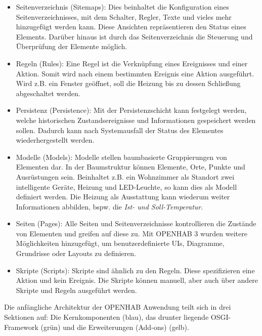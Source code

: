     \begin{itemize}
        \item Seitenverzeichnis (Sitemaps): Dies beinhaltet die Konfiguration eines Seitenverzeichnisses, mit dem Schalter, 
        Regler, Texte und vieles mehr hinzugefügt werden kann. Diese Ansichten repräsentieren den Status eines Elements. Darüber hinaus ist 
        durch das Seitenverzeichnis die Steuerung und Überprüfung der Elemente möglich.
        \item Regeln (Rules): Eine Regel ist die Verknüpfung eines Ereignisses und einer Aktion. Somit wird nach einem bestimmten 
        Ereignis eine Aktion ausgeführt. Wird z.B. ein Fenster geöffnet, soll die Heizung bis zu dessen Schließung abgeschaltet werden. 
        \item Persistenz (Persistence): Mit der Persistenzschicht kann festgelegt werden, welche historischen Zustandsereignisse 
        und Informationen gespeichert werden sollen. Dadurch kann nach Systemausfall der Status des Elementes wiederhergestellt werden. 
        \item Modelle (Models): Modelle stellen baumbasierte Gruppierungen von Elementen dar. In der Baumstruktur können Elemente, 
        Orte, Punkte und Ausrüstungen sein. Beinhaltet z.B. ein Wohnzimmer als Standort zwei intelligente Geräte, Heizung und LED-Leuchte, so kann dies als Modell 
        definiert werden. Die Heizung als Ausstattung kann wiederum weiter Informationen abbilden, bspw. die \textit{Ist- und Soll-Temperatur}.
        \item Seiten (Pages): Alle Seiten und Seitenverzeichnisse kontrollieren die Zustände von Elementen und greifen auf diese zu. 
        Mit \acs{OPENHAB} 3 wurden weitere Möglichkeiten hinzugefügt, um benutzerdefinierte \acs{UI}s, Diagramme, Grundrisse oder 
        Layouts zu definieren. 
        \item Skripte (Scripts): Skripte sind ähnlich zu den Regeln. Diese spezifizieren eine Aktion und kein Ereignis. Die Skripte 
        können manuell, aber auch über andere Skripte und Regeln ausgeführt werden. 
    \end{itemize}
    Die anfängliche Architektur der \acs{OPENHAB} Anwendung teilt sich in drei Sektionen auf: Die Kernkomponenten (blau), das drunter 
    liegende \acs{OSGI}-Framework (grün) und die Erweiterungen (Add-ons) (gelb). 
